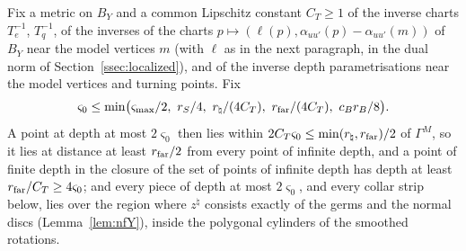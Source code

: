 Fix a metric on $B_Y$ and a common Lipschitz constant $C_T\ge1$ of the inverse charts $T_e^{-1}$, $T_q^{-1}$, of the
inverses of the charts $p\mapsto(\ell(p),\alpha_{uu'}(p)-\alpha_{uu'}(m))$ of $B_Y$ near the model vertices $m$ (with $\ell$ as
in the next paragraph, in the dual norm of Section~\ref{ssec:localized}), and of the
inverse depth parametrisations near the model vertices and turning points. Fix
\[
\varsigma_0\le\min\bigl(\varsigma_{\max}/2,\ r_S/4,\ r_\natural/(4C_T),\ r_{\rm far}/(4C_T),\ c_Br_B/8\bigr).
\]
A point at depth at most $2\varsigma_0$ then lies within $2C_T\varsigma_0\le\min(r_\natural,r_{\rm far})/2$ of $\Gamma^M$, so
it lies at distance at least $r_{\rm far}/2$ from every point of infinite depth, and a point of finite depth in the closure
of the set of points of infinite depth has depth at least $r_{\rm far}/C_T\ge4\varsigma_0$; and every piece of
depth at most $2\varsigma_0$, and every collar strip below, lies over the region where $z^\natural$ consists exactly of the
germs and the normal discs (Lemma~\ref{lem:nfY}), inside the polygonal cylinders of the smoothed rotations.

